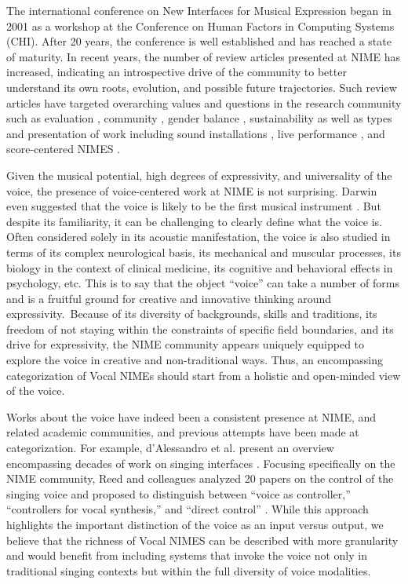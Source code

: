\documentclass[sigconf]{nimeart}
\begin{document}
The international conference on New Interfaces for Musical Expression began in 2001 as a workshop at the Conference on Human Factors in Computing Systems (CHI). After 20 years, the conference is well established and has reached a state of maturity. In recent years, the number of review articles presented at NIME has increased, indicating an introspective drive of the community to better understand its own roots, evolution, and possible future trajectories. Such review articles have targeted overarching values and questions in the research community such as evaluation \cite{barbosa2015does}, community \cite{marquez2015fourteen}, gender balance \cite{xambo2018women}, sustainability \cite{masu2021nime} as well as types and presentation of work including sound installations \cite{fraisse2021visualization}, live performance \cite{west2021making}, and score-centered NIMES \cite{masu2021nime}.

Given the musical potential, high degrees of expressivity, and universality of the voice, the presence of voice-centered work at NIME is not surprising. Darwin even suggested that the voice is likely to be the first musical instrument \cite{darwin1964origin}. But despite its familiarity, it can be challenging to clearly define what the voice is. Often considered solely in its acoustic manifestation, the voice is also studied in terms of its complex neurological basis, its mechanical and muscular processes, its biology in the context of clinical medicine, its cognitive and behavioral effects in psychology, etc. This is to say that the object ``voice'' can take a number of forms and is a fruitful ground for creative and innovative thinking around expressivity.~Because of its diversity of backgrounds, skills and traditions, its freedom of not staying within the constraints of specific field boundaries, and its drive for expressivity, the NIME community appears uniquely equipped to explore the voice in creative and non-traditional ways. Thus, an encompassing categorization of Vocal NIMEs should start from a holistic and open-minded view of the voice.~

Works about the voice have indeed been a consistent presence at NIME, and related academic communities, and previous attempts have been made at categorization. For example, d'Alessandro et al. present an overview encompassing decades of work on singing interfaces \cite{d2019instruments}. Focusing specifically on the NIME community, Reed and colleagues analyzed 20 papers on the control of the singing voice and proposed to distinguish between ``voice as controller,'' ``controllers for vocal synthesis,'' and ``direct control'' \cite{reed2020surface}. While this approach highlights the important distinction of the voice as an input versus output, we believe that the richness of Vocal NIMES can be described with more granularity and would benefit from including systems that invoke the voice not only in traditional singing contexts but within the full diversity of voice modalities.
\end{document}

